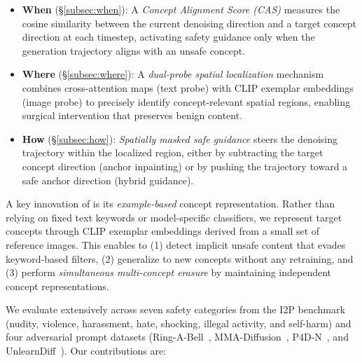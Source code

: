 \begin{itemize}[leftmargin=1.5em,itemsep=2pt]
    \item \textbf{When} (\S\ref{subsec:when}): A \emph{Concept Alignment Score (CAS)} measures the cosine similarity between the current denoising direction and a target concept direction at each timestep, activating safety guidance only when the generation trajectory aligns with an unsafe concept.
    \item \textbf{Where} (\S\ref{subsec:where}): A \emph{dual-probe spatial localization} mechanism combines cross-attention maps (text probe) with CLIP exemplar embeddings (image probe) to precisely identify concept-relevant spatial regions, enabling surgical intervention that preserves benign content.
    \item \textbf{How} (\S\ref{subsec:how}): \emph{Spatially masked safe guidance} steers the denoising trajectory within the localized region, either by subtracting the target concept direction (anchor inpainting) or by pushing the trajectory toward a safe anchor direction (hybrid guidance).
\end{itemize}

A key innovation of \ours{} is its \emph{example-based} concept representation. Rather than relying on fixed text keywords or model-specific classifiers, we represent target concepts through CLIP exemplar embeddings derived from a small set of reference images. This enables \ours{} to (1) detect implicit unsafe content that evades keyword-based filters, (2) generalize to new concepts without any retraining, and (3) perform \emph{simultaneous multi-concept erasure} by maintaining independent concept representations.

We evaluate \ours{} extensively across seven safety categories from the I2P benchmark~\citep{schramowski2023safe} (nudity, violence, harassment, hate, shocking, illegal activity, and self-harm) and four adversarial prompt datasets (Ring-A-Bell~\citep{tsai2024ring}, MMA-Diffusion~\citep{yang2024mma}, P4D-N~\citep{chin2024prompting4debugging}, and UnlearnDiff~\citep{zhang2024generate}). Our contributions are:

